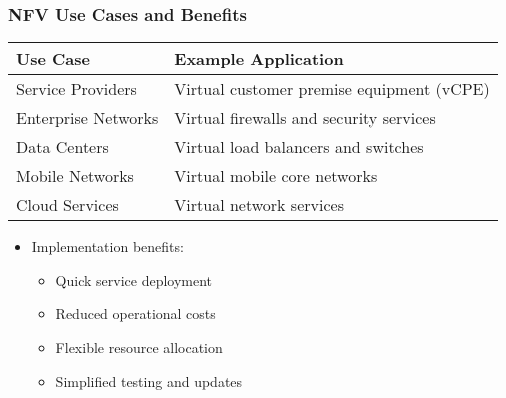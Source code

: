 \documentclass{beamer}
\begin{document}
\begin{frame}
    \frametitle{NFV Use Cases and Benefits}
    
    \begin{tabular}{|p{}|p{}|}
        \hline
        \textbf{Use Case} & \textbf{Example Application} \\
        \hline
        Service Providers & Virtual customer premise equipment (vCPE) \\
        \hline
        Enterprise Networks & Virtual firewalls and security services \\
        \hline
        Data Centers & Virtual load balancers and switches \\
        \hline
        Mobile Networks & Virtual mobile core networks \\
        \hline
        Cloud Services & Virtual network services \\
        \hline
    \end{tabular}
    
    \begin{itemize}
        \item Implementation benefits:
        \begin{itemize}
            \item Quick service deployment
            \item Reduced operational costs
            \item Flexible resource allocation
            \item Simplified testing and updates
        \end{itemize}
    \end{itemize}
\end{frame}
\end{document}
